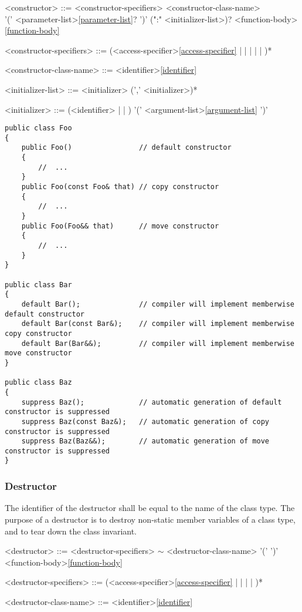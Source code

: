 \documentclass[a4paper,oneside,11pt]{article}
\begin{document}
\begin{grammar}
\label{constructor}<constructor> ::= <constructor-specifiers> <constructor-class-name>\\
'(' <parameter-list>\ref{parameter-list}? ')' (":" <initializer-list>)? <function-body>\ref{function-body}

<constructor-specifiers> ::= (<access-specifier>\ref{access-specifier} |  |  |  |  | )*

<constructor-class-name> ::= <identifier>\ref{identifier}

<initializer-list> ::= <initializer> (',' <initializer>)*

<initializer>  ::= (<identifier> |  | ) '(' <argument-list>\ref{argument-list} ')'
\end{grammar}

\begin{lstlisting}[frame=trBL]
public class Foo
{
    public Foo()                // default constructor
    {
        //  ...
    }
    public Foo(const Foo& that) // copy constructor
    {
        //  ...
    }
    public Foo(Foo&& that)      // move constructor
    {
        //  ...
    }
}

public class Bar
{
    default Bar();              // compiler will implement memberwise default constructor
    default Bar(const Bar&);    // compiler will implement memberwise copy constructor
    default Bar(Bar&&);         // compiler will implement memberwise move constructor
}

public class Baz
{
    suppress Baz();             // automatic generation of default constructor is suppressed
    suppress Baz(const Baz&);   // automatic generation of copy constructor is suppressed
    suppress Baz(Baz&&);        // automatic generation of move constructor is suppressed
}
\end{lstlisting}

\subsubsection{Destructor}

The identifier of the destructor shall be equal to the name of the class type.
The purpose of a destructor is to destroy non-static member variables of a class type,
and to tear down the class invariant.

\begin{grammar}
\label{destructor}<destructor> ::= <destructor-specifiers> $\sim$ <destructor-class-name> '(' ')' <function-body>\ref{function-body}

<destructor-specifiers> ::= (<access-specifier>\ref{access-specifier} |  |  |  | )*

<destructor-class-name> ::= <identifier>\ref{identifier}
\end{grammar}
\end{document}
